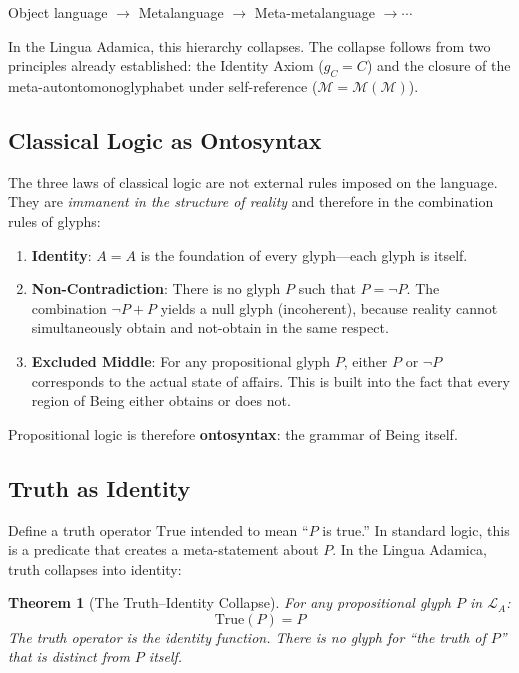 \documentclass[12pt, letterpaper]{book}
\def\equiv{=}%
\def\oplus{+}%
\def\mathfrak#1{#1}%
\newtheorem{theorem}{Theorem}[chapter]
\begin{document}
\begin{center}
Object language $\to$ Metalanguage $\to$ Meta-metalanguage $\to \cdots$
\end{center}

In the Lingua Adamica, this hierarchy collapses. The collapse follows from two principles already established: the Identity Axiom ($\mathfrak{g}_C \equiv C$) and the closure of the meta-autontomonoglyphabet under self-reference ($\mathcal{M} \equiv \mathcal{M}(\mathcal{M})$).

\subsection{Classical Logic as Ontosyntax}

The three laws of classical logic are not external rules imposed on the language. They are \textit{immanent in the structure of reality} and therefore in the combination rules of glyphs:

\begin{enumerate}[label=(\roman*)]
    \item \textbf{Identity}: $A \equiv A$ is the foundation of every glyph---each glyph is itself.
    \item \textbf{Non-Contradiction}: There is no glyph $P$ such that $P \equiv \neg P$. The combination $\neg P \oplus P$ yields a null glyph (incoherent), because reality cannot simultaneously obtain and not-obtain in the same respect.
    \item \textbf{Excluded Middle}: For any propositional glyph $P$, either $P$ or $\neg P$ corresponds to the actual state of affairs. This is built into the fact that every region of Being either obtains or does not.
\end{enumerate}

Propositional logic is therefore \textbf{ontosyntax}: the grammar of Being itself.

\subsection{Truth as Identity}

Define a truth operator $\mathrm{True}$ intended to mean ``$P$ is true.'' In standard logic, this is a predicate that creates a meta-statement about $P$. In the Lingua Adamica, truth collapses into identity:

\begin{theorem}[The Truth--Identity Collapse]\label{thm:truth-identity}
For any propositional glyph $P$ in $\mathcal{L}_A$:
\[
\mathrm{True}(P) \equiv P
\]
The truth operator is the identity function. There is no glyph for ``the truth of $P$'' that is distinct from $P$ itself.
\end{theorem}
\end{document}

